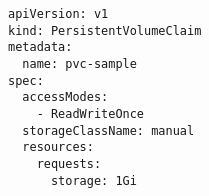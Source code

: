 \begin{verbatim}
apiVersion: v1
kind: PersistentVolumeClaim
metadata:
  name: pvc-sample
spec:
  accessModes:
    - ReadWriteOnce
  storageClassName: manual
  resources:
    requests:
      storage: 1Gi
\end{verbatim}